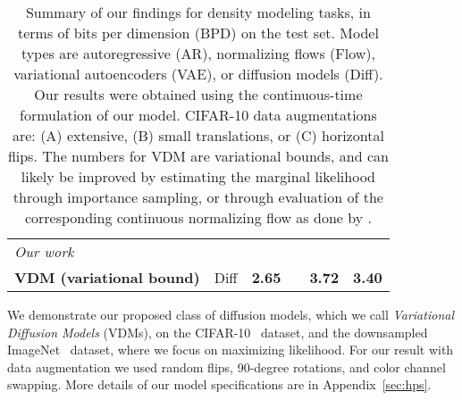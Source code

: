 \documentclass{article}
\begin{document}
\begin{table}[t]
\begin{center}
\begin{tabular}{lccccc}
\midrule
\textit{Our work}\\
\textbf{VDM (variational bound)} & Diff & \textbf{2.65} &  & \textbf{3.72} & \textbf{3.40} \\
\bottomrule
\end{tabular}
\end{center}
\caption{Summary of our findings for density modeling tasks, in terms of bits per dimension (BPD) on the test set. Model types are autoregressive (AR), normalizing flows (Flow), variational autoencoders (VAE), or diffusion models (Diff). Our results were obtained using the continuous-time formulation of our model. CIFAR-10 data augmentations are: (A) extensive, (B) small translations, or (C) horizontal flips. The numbers for VDM are variational bounds, and can likely be improved by estimating the marginal likelihood through importance sampling, or through evaluation of the corresponding continuous normalizing flow as done by \cite{song2021maximum}.}
\label{table:results}
\end{table}

We demonstrate our proposed class of diffusion models, which we call \emph{Variational Diffusion Models} (VDMs), on the CIFAR-10~\citep{krizhevsky2009learning} dataset, and the downsampled ImageNet~\citep{van2016pixel, deng2009imagenet} dataset, where we focus on maximizing likelihood. For our result with data augmentation we used random flips, 90-degree rotations, and color channel swapping. More details of our model specifications are in Appendix~\ref{sec:hps}.
\end{document}
